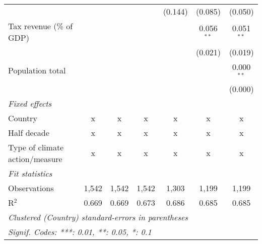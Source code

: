 \begin{tabular}{lcccccc}
                                                    &         &         &                & (0.144)        & (0.085)        & (0.050)\\   
   Tax revenue (\% of GDP)                          &         &         &                &                & 0.056$^{**}$   & 0.051$^{**}$\\   
                                                    &         &         &                &                & (0.021)        & (0.019)\\   
   Population total                                 &         &         &                &                &                & 0.000$^{**}$\\   
                                                    &         &         &                &                &                & (0.000)\\   
   \emph{Fixed effects}\\
   Country                                          & x       & x       & x              & x              & x              & x\\  
   Half decade                                      & x       & x       & x              & x              & x              & x\\  
   Type of climate action/measure                   & x       & x       & x              & x              & x              & x\\  
   \midrule \emph{Fit statistics}\\
   Observations                                     & 1,542   & 1,542   & 1,542          & 1,303          & 1,199          & 1,199\\  
   R$^2$                                            & 0.669   & 0.669   & 0.673          & 0.686          & 0.685          & 0.685\\  
   \midrule
   \multicolumn{7}{l}{\emph{Clustered (Country) standard-errors in parentheses}}\\
   \multicolumn{7}{l}{\emph{Signif. Codes: ***: 0.01, **: 0.05, *: 0.1}}\\
\end{tabular}
\par\endgroup


